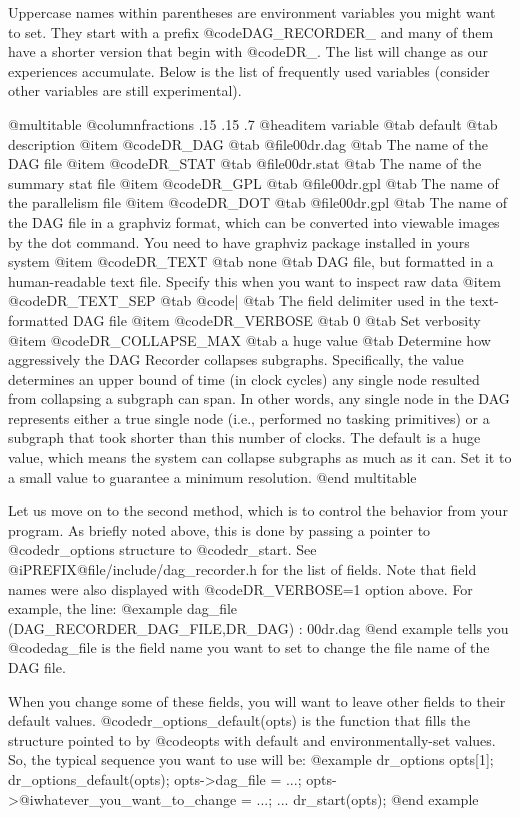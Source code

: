 Uppercase names within parentheses are environment variables you might want to
set.  They start with a prefix @code{DAG_RECORDER_} and many of them
have a shorter version that begin with @code{DR_}.  The list will change
as our experiences accumulate.  Below is the list of frequently used
variables (consider other variables are still experimental).

@multitable @columnfractions .15 .15 .7
@headitem variable @tab default @tab description
@item @code{DR_DAG}  @tab @file{00dr.dag}  @tab The name of the DAG file 
@item @code{DR_STAT} @tab @file{00dr.stat} @tab The name of the summary stat file 
@item @code{DR_GPL}  @tab @file{00dr.gpl}  @tab The name of the parallelism file 
@item @code{DR_DOT}  @tab @file{00dr.gpl}  @tab The name of the DAG file in a graphviz format, which can be converted into viewable images by the dot command.  You need to have graphviz package installed in yours system 
@item @code{DR_TEXT} @tab none      @tab DAG file, but formatted in a human-readable text file.
Specify this when you want to inspect raw data 
@item @code{DR_TEXT_SEP} @tab @code{|} @tab The field delimiter used in the text-formatted DAG file 
@item @code{DR_VERBOSE}  @tab 0  @tab Set verbosity 
@item @code{DR_COLLAPSE_MAX} @tab a huge value @tab Determine how aggressively the DAG Recorder collapses subgraphs.  Specifically, the value determines an upper bound of time (in clock cycles) any single node resulted from collapsing a subgraph can span.  In other words, any single node in the DAG represents either a true single node (i.e., performed no tasking primitives) or a subgraph that took shorter than this number of clocks.  The default is a huge value, which means the system can collapse subgraphs as much as it can.  Set it to a small value to guarantee a minimum resolution.
@end multitable

Let us move on to the second method, which is to control the behavior
from your program.  As briefly noted above, this is done by passing a
pointer to @code{dr_options} structure to @code{dr_start}.  See
@i{PREFIX}@file{/include/dag_recorder.h} for the list of fields.  Note
that field names were also displayed with @code{DR_VERBOSE=1} option
above.  For example, the line:
@example
dag_file (DAG_RECORDER_DAG_FILE,DR_DAG) : 00dr.dag
@end example
tells you @code{dag_file} is the field name you want to set to change
the file name of the DAG file.

When you change some of these fields, you will want to leave other
fields to their default values.  @code{dr_options_default(opts)}
is the function that fills the structure pointed to by @code{opts}
with default and environmentally-set values.  So, the typical sequence you want to use will be:
@example
dr_options opts[1];
dr_options_default(opts);
opts->dag_file = ...;
opts->@i{whatever_you_want_to_change} = ...;
   ...
dr_start(opts);
@end example


